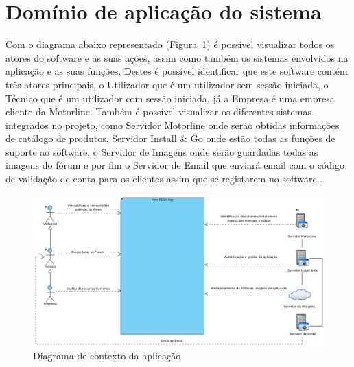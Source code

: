 \section{Domínio de aplicação do sistema}

Com o diagrama abaixo representado (Figura~\ref{fig:2}) é possível visualizar todos os atores do software 
e as suas ações, assim como também os sistemas envolvidos na aplicação e as suas funções.
Destes é possível identificar que este software contém três atores principais, o Utilizador que é um 
utilizador sem sessão iniciada, o Técnico que é um utilizador com sessão iniciada, já a Empresa é uma empresa
cliente da Motorline. Também é possível visualizar os diferentes sistemas integrados no 
projeto, como Servidor Motorline onde serão obtidas informações de catálogo de produtos, 
Servidor Install \& Go onde estão todas as funções de suporte ao software, o Servidor de Imagens onde 
serão guardadas todas as imagens do fórum e por fim o Servidor de Email que enviará email com o código de 
validação de conta para os clientes assim que se registarem no software .

\begin{figure}[htb]
    \centering
    
    \includegraphics[width=\textwidth]{images/diagramas/diagrama_contexto.png}
    \caption{Diagrama de contexto da aplicação}
    \label{fig:2}
\end{figure}
